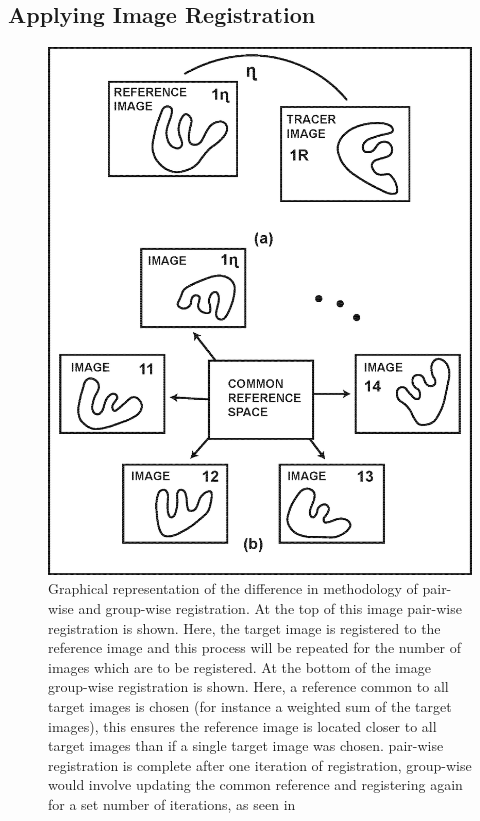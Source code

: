         \subsection{Applying Image Registration} \label{sec:applying_image_registration}
            \begin{figure}
                \centering
                        
                \includegraphics[width=0.9\linewidth]{figures/background_applying_image_registration_pairwise_groupwise_comparison.png}
                        
                \captionsetup{singlelinecheck=false, justification=raggedright}
                \caption{Graphical representation of the difference in methodology of pair-wise and group-wise registration. At the top of this image pair-wise registration is shown. Here, the target image is registered to the reference image and this process will be repeated for the number of images which are to be registered. At the bottom of the image group-wise registration is shown. Here, a reference common to all target images is chosen (for instance a weighted sum of the target images), this ensures the reference image is located closer to all target images than if a single target image was chosen. pair-wise registration is complete after one iteration of registration, group-wise would involve updating the common reference and registering again for a set number of iterations, as seen in~} \label{fig:applying_image_registration_pair-wise_group-wise_comparison}
            \end{figure}
            
